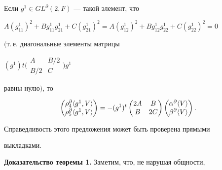 \begin{prop} Если $g^1\in GL^\partial(2,F)$ --- такой элемент, что 


$A(g^1_{11})^2+B g^1_{11}g^1_{21}+C(g^1_{21})^2= 


A(g^1_{12})^2+B g^1_{12}g^1_{22}+C(g^1_{22})^2=0$ 


$($т.\,е. диагональные элементы матрицы 


$(g^1)t\Big(\begin{smallmatrix}A & B/2 \\ B/2 & C\end{smallmatrix} 


\Big)g^1$ 


равны нулю$)$, то 


\begin{equation} 


\begin{pmatrix} 


\rho^\partial_4\la g^1,V \ra \\ 


\rho^\partial_5\la g^1,V \ra 


\end{pmatrix} 


=-(g^1)^t 


\begin{pmatrix} 


2A & B \\ B & 2C 


\end{pmatrix} 


\begin{pmatrix} 


\alpha^\partial\la V \ra \\ \beta^\partial\la V \ra 


\end{pmatrix} 


. 


\end{equation} 


\end{prop} 


 


Справедливость этого предложения может быть проверена прямыми 


выкладками. 


 


{\bf Доказательство теоремы 1.} Заметим, что, не нарушая общности, 


